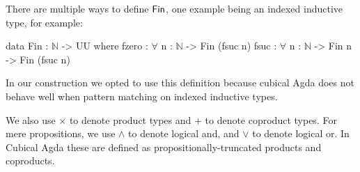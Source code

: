 \noindent
There are multiple ways to define $\Fin$, one example being an indexed inductive type,
for example:
\vspace{-1em}
\begin{code}
data Fin : $\mathbb{N}$ -> UU where
    fzero : $\forall$ {n : $\mathbb{N}$} -> Fin (fsuc n)
    fsuc  : $\forall$ {n : $\mathbb{N}$} -> Fin n -> Fin (fsuc n)
\end{code}
In our construction we opted to use this definition because cubical Agda does not behave well
when pattern matching on indexed inductive types.

We also use $\times$ to denote product types and $+$ to denote coproduct types.
For mere propositions, we use $\land$ to denote logical and, and $\vee$ to denote logical or.
In Cubical Agda these are defined as propositionally-truncated products and coproducts.